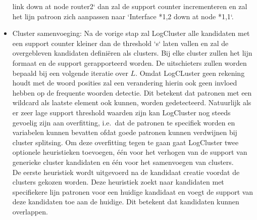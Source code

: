 \begin{itemize}
    link down at node router2` dan zal de support counter incrementeren en zal het lijn patroon zich aanpassen naar `Interface *{1,2} down at node *{1,1}`.\\
    \item Cluster samenvoeging: Na de vorige stap zal LogCluster alle kandidaten met een support counter kleiner dan de threshold `s` laten vallen en zal de overgebleven kandidaten definiëren als clusters. Bij elke cluster zullen het lijn formaat en de support gerapporteerd worden. De uitschieters zullen worden bepaald bij een volgende iteratie over $L$. Omdat LogCLuster geen rekening houdt met de woord posities zal een verandering hierin ook geen invloed hebben op de frequente woorden detectie. Dit betekent dat patronen met een wildcard als laatste element ook kunnen, worden gedetecteerd. Natuurlijk als er zeer lage support threshold waarden zijn kan LogCluster nog steeds gevoelig zijn aan overfitting, i.e.\ dat de patronen te specifiek worden en variabelen kunnen bevatten ofdat goede patronen kunnen verdwijnen bij cluster splitsing. Om deze overfitting tegen te gaan gaat LogCluster twee optionele heuristieken toevoegen, één voor het verhogen van de support van generieke cluster kandidaten en één voor het samenvoegen van clusters.\\
    
    \subitem De eerste heuristiek wordt uitgevoerd na de kandidaat creatie voordat de clusters gekozen worden. Deze heuristiek zoekt naar kandidaten met specifiekere lijn patronen voor een huidige kandidaat en voegt de support van deze kandidaten toe aan de huidige. Dit betekent dat kandidaten kunnen overlappen.\\
    

\end{itemize}
